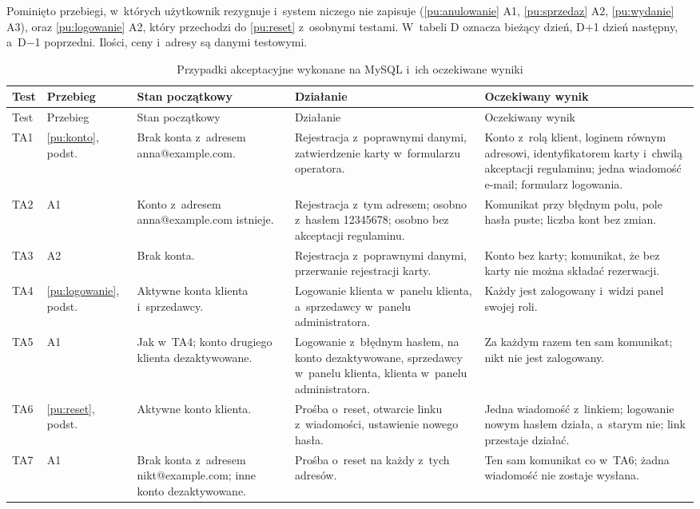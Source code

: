 \documentclass[12pt,a4paper,oneside]{article}
\newcounter{pu}
\begin{document}
Pominięto przebiegi, w~których użytkownik rezygnuje i~system niczego nie zapisuje (\ref{pu:anulowanie} A1, \ref{pu:sprzedaz} A2, \ref{pu:wydanie} A3), oraz \ref{pu:logowanie} A2, który przechodzi do \ref{pu:reset} z~osobnymi testami. W~tabeli D oznacza bieżący dzień, D+1 dzień następny, a~D$-$1 poprzedni. Ilości, ceny i~adresy są danymi testowymi.

{\small
\begin{longtable}{@{}L{0.9cm}L{1.5cm}L{3.8cm}L{3.6cm}L{4.5cm}@{}}
	\caption{Przypadki akceptacyjne wykonane na MySQL i~ich oczekiwane wyniki}
	\label{tab:testy-akceptacyjne}\\
	\toprule
	Test & Przebieg & Stan początkowy & Działanie & Oczekiwany wynik \\
	\midrule
	\endfirsthead
	\toprule
	Test & Przebieg & Stan początkowy & Działanie & Oczekiwany wynik \\
	\midrule
	\endhead
	\bottomrule
	\endfoot
	TA1 & \ref{pu:konto}, podst. & Brak konta z~adresem anna@example.com. & Rejestracja z~poprawnymi danymi, zatwierdzenie karty w~formularzu operatora. & Konto z~rolą klient, loginem równym adresowi, identyfikatorem karty i~chwilą akceptacji regulaminu; jedna wiadomość e-mail; formularz logowania. \\
	TA2 & A1 & Konto z~adresem anna@example.com istnieje. & Rejestracja z~tym adresem; osobno z~hasłem 12345678; osobno bez akceptacji regulaminu. & Komunikat przy błędnym polu, pole hasła puste; liczba kont bez zmian. \\
	TA3 & A2 & Brak konta. & Rejestracja z~poprawnymi danymi, przerwanie rejestracji karty. & Konto bez karty; komunikat, że bez karty nie można składać rezerwacji. \\
	\midrule
	TA4 & \ref{pu:logowanie}, podst. & Aktywne konta klienta i~sprzedawcy. & Logowanie klienta w~panelu klienta, a~sprzedawcy w~panelu administratora. & Każdy jest zalogowany i~widzi panel swojej roli. \\
	TA5 & A1 & Jak w~TA4; konto drugiego klienta dezaktywowane. & Logowanie z~błędnym hasłem, na konto dezaktywowane, sprzedawcy w~panelu klienta, klienta w~panelu administratora. & Za każdym razem ten sam komunikat; nikt nie jest zalogowany. \\
	\midrule
	TA6 & \ref{pu:reset}, podst. & Aktywne konto klienta. & Prośba o~reset, otwarcie linku z~wiadomości, ustawienie nowego hasła. & Jedna wiadomość z~linkiem; logowanie nowym hasłem działa, a~starym nie; link przestaje działać. \\
	TA7 & A1 & Brak konta z~adresem nikt@example.com; inne konto dezaktywowane. & Prośba o~reset na każdy z~tych adresów. & Ten sam komunikat co w~TA6; żadna wiadomość nie zostaje wysłana. \\

\end{longtable}}
\end{document}
